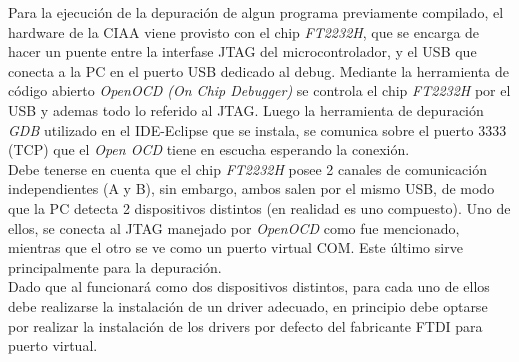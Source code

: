 \documentclass[12pt,letterpaper]{article}
\begin{document}
Para la ejecución de la depuración de algun programa previamente compilado, el hardware de la CIAA viene provisto con el chip \textit{FT2232H}, que se encarga de hacer un puente entre la interfase JTAG del microcontrolador, y el USB que conecta a la PC en el puerto USB dedicado al debug. Mediante la herramienta de código abierto \textit{OpenOCD (On Chip Debugger)} se controla el chip \textit{FT2232H} por el USB y ademas todo lo referido al JTAG. Luego la herramienta de depuración \textit{GDB} utilizado en el IDE-Eclipse que se instala, se comunica sobre el puerto 3333 (TCP) que el \textit{Open OCD} tiene en escucha esperando la conexión.\\

Debe tenerse en cuenta que el chip \textit{FT2232H} posee 2 canales de comunicación independientes (A y B), sin embargo, ambos salen por el mismo USB, de modo que la PC detecta 2 dispositivos distintos (en realidad es uno compuesto). Uno de ellos, se conecta al JTAG manejado por \textit{OpenOCD} como fue mencionado, mientras que el otro se ve como un puerto virtual COM. Este último sirve principalmente para la depuración.\\
Dado que al funcionará como dos dispositivos distintos, para cada uno de ellos debe realizarse la instalación de un driver adecuado, en principio debe optarse por realizar la instalación de los drivers por defecto del fabricante FTDI para puerto virtual.\\ %
\end{document}
